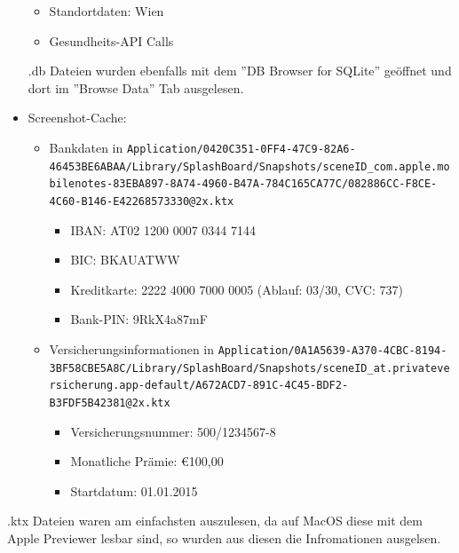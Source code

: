 \documentclass[12pt, a4paper, titlepage, oneside]{scrartcl}
\begin{document}
\begin{itemize}
\begin{itemize}
				\item Standortdaten: Wien

				\item Gesundheits-API Calls
			\end{itemize}

			.db Dateien wurden ebenfalls mit dem ''DB Browser for SQLite'' geöffnet und
			dort im ''Browse Data'' Tab ausgelesen.

		\item Screenshot-Cache:
			\begin{itemize}
				\item Bankdaten in \lstinline{Application/0420C351-0FF4-47C9-82A6-46453BE6ABAA/Library/SplashBoard/Snapshots/sceneID_com.apple.mobilenotes-83EBA897-8A74-4960-B47A-784C165CA77C/082886CC-F8CE-4C60-B146-E42268573330@2x.ktx}
					\begin{itemize}
						\item IBAN: AT02 1200 0007 0344 7144

						\item BIC: BKAUATWW

						\item Kreditkarte: 2222 4000 7000 0005 (Ablauf: 03/30, CVC: 737)

						\item Bank-PIN: 9RkX4a87mF
					\end{itemize}

				\item Versicherungsinformationen in \lstinline{Application/0A1A5639-A370-4CBC-8194-3BF58CBE5A8C/Library/SplashBoard/Snapshots/sceneID_at.privateversicherung.app-default/A672ACD7-891C-4C45-BDF2-B3FDF5B42381@2x.ktx}
					\begin{itemize}
						\item Versicherungsnummer: 500/1234567-8

						\item Monatliche Prämie: €100,00

						\item Startdatum: 01.01.2015
					\end{itemize}
			\end{itemize}
	\end{itemize}

	.ktx Dateien waren am einfachsten auszulesen, da auf MacOS diese mit dem Apple
	Previewer lesbar sind, so wurden aus diesen die Infromationen ausgelsen.
\end{document}
